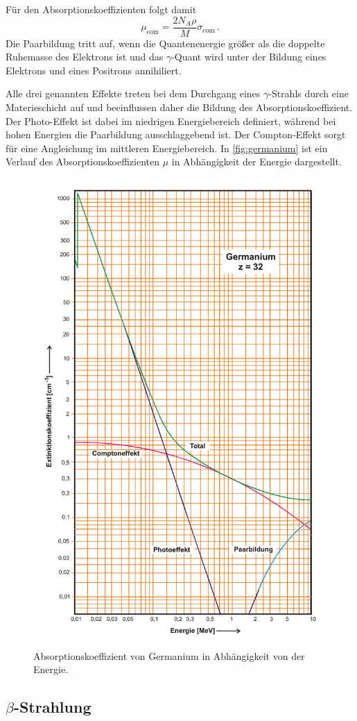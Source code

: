 Für den Absorptionskoeffizienten folgt damit
\begin{equation}
    \mu_\text{com}=\frac{2 N_{A} \rho}{M} \sigma_\text{com} \, .
\end{equation}
Die Paarbildung tritt auf, wenn die Quantenenergie größer als die doppelte Ruhemasse des Elektrons ist
und das $\gamma$-Quant wird unter der Bildung eines Elektrons und eines Positrons annihiliert.

Alle drei genannten Effekte treten bei dem Durchgang eines $\gamma$-Strahls durch eine Materieschicht auf
und beeinflussen daher die Bildung des Absorptionskoeffizient.
Der Photo-Effekt ist dabei im niedrigen Energiebereich definiert, während bei hohen Energien die Paarbildung ausschlaggebend ist. 
Der Compton-Effekt sorgt für eine Angleichung im mittleren Energiebereich. 
In \autoref{fig:germanium} ist ein Verlauf des Absorptionskoeffizienten $\mu$ in Abhängigkeit der Energie dargestellt.
\begin{figure}
    \centering
    \includegraphics[width=0.6\linewidth]{pictures/germanium.pdf}
    \caption{Absorptionskoeffizient von Germanium in Abhängigkeit von der Energie. \cite{v704}}
    \label{fig:germanium}
\end{figure}


\subsection[Beta-Strahlung]{$\beta$-Strahlung}

